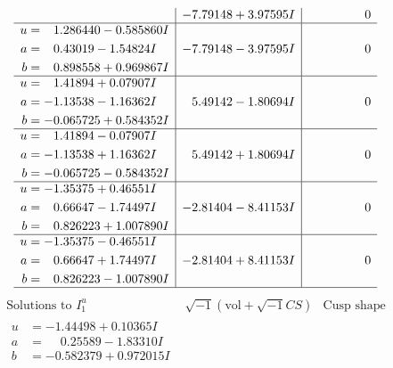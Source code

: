 \documentclass[1p]{elsarticle_modified}
\theoremstyle{definition}
\newcommand{\I}{\sqrt{-1}}
\begin{document}
$$\begin{array}{c|c|c}
 & -7.79148 + 3.97595 I & \phantom{-0.000000 } 0 \\ \hline\begin{aligned}
u &= \phantom{-}1.286440 - 0.585860 I \\
a &= \phantom{-}0.43019 - 1.54824 I \\
b &= \phantom{-}0.898558 + 0.969867 I\end{aligned}
 & -7.79148 - 3.97595 I & \phantom{-0.000000 } 0 \\ \hline\begin{aligned}
u &= \phantom{-}1.41894 + 0.07907 I \\
a &= -1.13538 - 1.16362 I \\
b &= -0.065725 + 0.584352 I\end{aligned}
 & \phantom{-}5.49142 - 1.80694 I & \phantom{-0.000000 } 0 \\ \hline\begin{aligned}
u &= \phantom{-}1.41894 - 0.07907 I \\
a &= -1.13538 + 1.16362 I \\
b &= -0.065725 - 0.584352 I\end{aligned}
 & \phantom{-}5.49142 + 1.80694 I & \phantom{-0.000000 } 0 \\ \hline\begin{aligned}
u &= -1.35375 + 0.46551 I \\
a &= \phantom{-}0.66647 - 1.74497 I \\
b &= \phantom{-}0.826223 + 1.007890 I\end{aligned}
 & -2.81404 - 8.41153 I & \phantom{-0.000000 } 0 \\ \hline\begin{aligned}
u &= -1.35375 - 0.46551 I \\
a &= \phantom{-}0.66647 + 1.74497 I \\
b &= \phantom{-}0.826223 - 1.007890 I\end{aligned}
 & -2.81404 + 8.41153 I & \phantom{-0.000000 } 0\\
 \hline 
 \end{array}$$\newpage$$\begin{array}{c|c|c}  
\text{Solutions to }I^u_{1}& \I (\text{vol} + \sqrt{-1}CS) & \text{Cusp shape}\\
 \hline 
\begin{aligned}
u &= -1.44498 + 0.10365 I \\
a &= \phantom{-}0.25589 - 1.83310 I \\
b &= -0.582379 + 0.972015 I\end{aligned}

\end{array}$$
\end{document}
